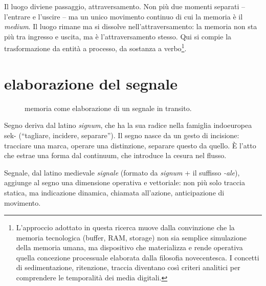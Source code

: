 Il luogo diviene passaggio, attraversamento. Non più due momenti separati – l'entrare e l'uscire – ma un unico movimento continuo di cui la memoria è il \emph{medium}. Il luogo rimane ma si dissolve nell'attraversamento: la memoria non sta più tra ingresso e uscita, ma è l'attraversamento stesso. Qui si compie la trasformazione da entità a processo, da sostanza a verbo\footnote{%
  L'approccio adottato in questa ricerca muove dalla convinzione che la memoria tecnologica (buffer, RAM, storage) non sia semplice simulazione della memoria umana, ma dispositivo che materializza e rende operativa quella concezione processuale elaborata dalla filosofia novecentesca. I concetti di sedimentazione, ritenzione, traccia diventano così criteri analitici per comprendere le temporalità dei media digitali.
}.

\section{elaborazione del segnale}

\begin{figure}[htbp]
\begin{center}
\caption{memoria come elaborazione di un segnale in transito.}
\label{slide5}
\end{center}
\end{figure}

Segno deriva dal latino \emph{signum}, che ha la sua radice nella famiglia indoeuropea {\phonfont *sek-} (“tagliare, incidere, separare”). Il segno nasce da un gesto di incisione: tracciare una marca, operare una distinzione, separare questo da quello. È l'atto che estrae una forma dal continuum, che introduce la cesura nel flusso.

Segnale, dal latino medievale \emph{signale} (formato da \emph{signum} + il suffisso \emph{-ale}), aggiunge al segno una dimensione operativa e vettoriale: non più solo traccia statica, ma indicazione dinamica, chiamata all'azione, anticipazione di movimento.

